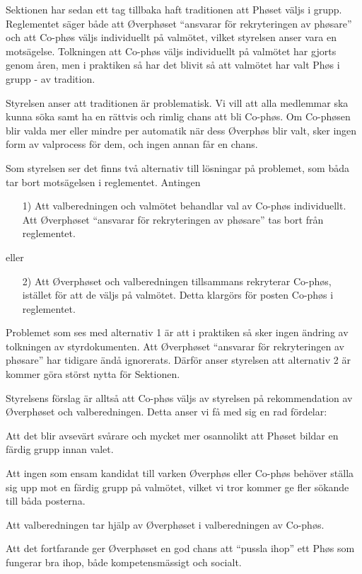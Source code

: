 \documentclass[../_main/handlingar.tex]{subfiles}
\begin{document}

Sektionen har sedan ett tag tillbaka haft traditionen att Phøset väljs i grupp. Reglementet säger både att Øverphøset ``ansvarar för rekryteringen av phøsare'' och att Co-phøs väljs individuellt på valmötet, vilket styrelsen anser vara en motsägelse. Tolkningen att Co-phøs väljs individuellt på valmötet har gjorts genom åren, men i praktiken så har det blivit så att valmötet har valt Phøs i grupp - av tradition.

Styrelsen anser att traditionen är problematisk. Vi vill att alla medlemmar ska kunna söka samt ha en rättvis och rimlig chans att bli Co-phøs. Om Co-phøsen blir valda mer eller mindre per automatik när dess Øverphøs blir valt, sker ingen form av valprocess för dem, och ingen annan får en chans.

Som styrelsen ser det finns två alternativ till lösningar på problemet, som båda tar bort motsägelsen i reglementet. Antingen
\begin{itemize}
    \item[1)] Att valberedningen och valmötet behandlar val av Co-phøs individuellt. Att Øverphøset ``ansvarar för rekryteringen av phøsare'' tas bort från reglementet.
\end{itemize}
eller
\begin{itemize}
    \item[2)] Att Øverphøset och valberedningen tillsammans rekryterar Co-phøs, istället för att de väljs på valmötet. Detta klargörs för posten Co-phøs i reglementet.
\end{itemize}

Problemet som ses med alternativ 1 är att i praktiken så sker ingen ändring av tolkningen av styrdokumenten. Att Øverphøset ``ansvarar för rekryteringen av phøsare'' har tidigare ändå ignorerats. Därför anser styrelsen att alternativ 2 är kommer göra störst nytta för Sektionen.

Styrelsens förslag är alltså att Co-phøs väljs av styrelsen på rekommendation  av Øverphøset och valberedningen. Detta anser vi få med sig en rad fördelar:

\begin{dashlist}
    \item Att det blir avsevärt svårare och mycket mer osannolikt att Phøset bildar en färdig grupp innan valet.
    \item Att ingen som ensam kandidat till varken Øverphøs eller Co-phøs behöver ställa sig upp mot en färdig grupp på valmötet, vilket vi tror kommer ge fler sökande till båda posterna.
    \item Att valberedningen tar hjälp av Øverphøset i valberedningen av Co-phøs.
    \item Att det fortfarande ger Øverphøset en god chans att ``pussla ihop'' ett Phøs som fungerar bra ihop, både kompetensmässigt och socialt.
\end{dashlist}
\end{document}
